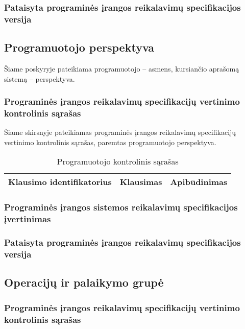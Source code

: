 \documentclass{VUMIFPSkursinis}
\begin{document}
\subsubsection{Pataisyta programinės įrangos reikalavimų specifikacijos versija}
\subsection{Programuotojo perspektyva}

Šiame poskyryje pateikiama programuotojo -- asmens, kursiančio aprašomą sistemą -- perspektyva.

\subsubsection{Programinės įrangos reikalavimų specifikacijų vertinimo kontrolinis sąrašas}

Šiame skirsnyje pateikiamas programinės įrangos reikalavimų specifikacijų vertinimo kontrolinis sąrašas,
paremtas programuotojo perspektyva.

\begin{center}
	\small
	\begin{longtable}{|L{3cm}|C{5cm}|C{7cm}|}
		\caption{Programuotojo kontrolinis sąrašas}
		\label{table:EmployeeSalary}
		\\ \hline
		Klausimo identifikatorius &
		Klausimas                 &
		Apibūdinimas                \\ \hline
	\end{longtable}
\end{center}

\subsubsection{Programinės įrangos sistemos reikalavimų specifikacijos įvertinimas}
\subsubsection{Pataisyta programinės įrangos reikalavimų specifikacijos versija}
\subsection{Operacijų ir palaikymo grupė}
\subsubsection{Programinės įrangos reikalavimų specifikacijų vertinimo kontrolinis sąrašas}
\end{document}
